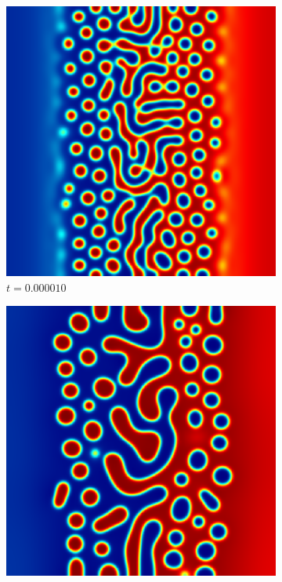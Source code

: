 \begin{figure}[ht]
	\begin{subfigure}[t]{.3\linewidth}
		\center
		\includegraphics[scale=.25]{linear_ch_3_10}
		\vspace{-.4\baselineskip}
		\caption{$t=0.000010$}
	\end{subfigure}
	\begin{subfigure}[t]{.3\linewidth}
		\center
		\includegraphics[scale=.25]{linear_ch_4_48}

\end{subfigure}
\end{figure}

